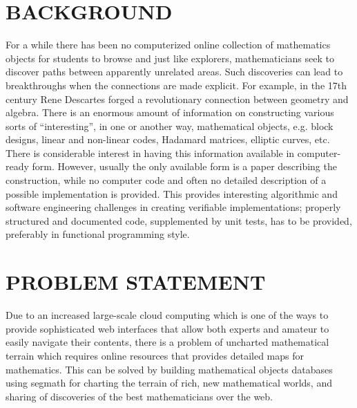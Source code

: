 \documentclass{article}
\begin{document}
\section{BACKGROUND}
For a while there has been no computerized online collection of mathematics objects for students to browse and just like explorers, mathematicians seek to discover paths between apparently unrelated areas. Such discoveries can lead to breakthroughs when the connections are made explicit. For example, in the 17th century Rene Descartes forged a revolutionary connection between geometry and algebra. 
There is an enormous amount of information on constructing various sorts of “interesting”, in one or another way, mathematical objects, e.g. block designs, linear and non-linear codes, Hadamard matrices, elliptic curves, etc.  There is considerable interest in having this information available in computer-ready form.  However, usually the only available form is a paper describing the construction, while no computer code and often no detailed description of a possible implementation is provided. This provides interesting algorithmic and software engineering challenges in creating verifiable implementations; properly structured and documented code, supplemented by unit tests, has to be provided, preferably in functional programming style. \\
\section{PROBLEM STATEMENT}
Due to an increased large-scale cloud computing which is one of the ways to provide sophisticated web interfaces that allow both experts and amateur to easily navigate their contents, there is a problem of uncharted mathematical terrain which requires online resources that provides detailed maps for mathematics. This can be solved by building mathematical objects databases using segmath for charting the terrain of rich, new mathematical worlds, and sharing of discoveries of the best mathematicians over the web.   \\
\end{document}
